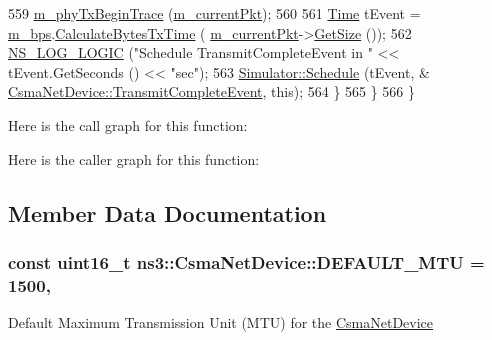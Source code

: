 \begin{DoxyCode}
559           \hyperlink{classns3_1_1CsmaNetDevice_a6c5deac5e6a05a2013175402d4e22985}{m\_phyTxBeginTrace} (\hyperlink{classns3_1_1CsmaNetDevice_a83f2aa389f676dec6bd1ff056bd61942}{m\_currentPkt});
560 
561           \hyperlink{namespacens3_1_1TracedValueCallback_a7ffd3e7c142ffe7c8a1d2db9b8de38ec}{Time} tEvent = \hyperlink{classns3_1_1CsmaNetDevice_a3051c17d676b00f0b2e95291d16c3769}{m\_bps}.\hyperlink{classns3_1_1DataRate_a5daa3d3b37b7df8bb75d94a6540fd17e}{CalculateBytesTxTime} (
      \hyperlink{classns3_1_1CsmaNetDevice_a83f2aa389f676dec6bd1ff056bd61942}{m\_currentPkt}->\hyperlink{classns3_1_1Packet_a462855c9929954d4301a4edfe55f4f1c}{GetSize} ());
562           \hyperlink{group__logging_ga88acd260151caf2db9c0fc84997f45ce}{NS\_LOG\_LOGIC} (\textcolor{stringliteral}{"Schedule TransmitCompleteEvent in "} << tEvent.GetSeconds () << \textcolor{stringliteral}{"sec"});
563           \hyperlink{classns3_1_1Simulator_a671882c894a08af4a5e91181bf1eec13}{Simulator::Schedule} (tEvent, &
      \hyperlink{classns3_1_1CsmaNetDevice_a3f908850087739df8d27e1a7207261aa}{CsmaNetDevice::TransmitCompleteEvent}, \textcolor{keyword}{this});
564         \}
565     \}
566 \}
\end{DoxyCode}


Here is the call graph for this function\+:




Here is the caller graph for this function\+:




\subsection{Member Data Documentation}
\subsubsection[{\texorpdfstring{D\+E\+F\+A\+U\+L\+T\+\_\+\+M\+TU}{DEFAULT_MTU}}]{\setlength{\rightskip}{0pt plus 5cm}const uint16\+\_\+t ns3\+::\+Csma\+Net\+Device\+::\+D\+E\+F\+A\+U\+L\+T\+\_\+\+M\+TU = 1500\hspace{0.3cm}{\ttfamily [static]}, {\ttfamily [private]}}\hypertarget{classns3_1_1CsmaNetDevice_aba1a157c1695a4c02b4dcba3490217e4}{}\label{classns3_1_1CsmaNetDevice_aba1a157c1695a4c02b4dcba3490217e4}
Default Maximum Transmission Unit (M\+TU) for the \hyperlink{classns3_1_1CsmaNetDevice}{Csma\+Net\+Device} 
